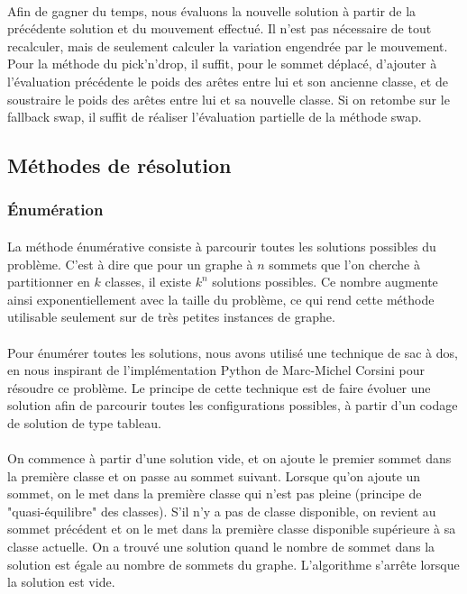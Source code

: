 \documentclass[12pt]{article}
\begin{document}
\paragraph{}Afin de gagner du temps, nous évaluons la nouvelle solution à partir de la précédente solution et du mouvement effectué. Il n'est pas nécessaire de tout recalculer, mais de seulement calculer la variation engendrée par le mouvement. Pour la méthode du pick'n'drop, il suffit, pour le sommet déplacé, d'ajouter à l'évaluation précédente le poids des arêtes entre lui et son ancienne classe, et de soustraire le poids des arêtes entre lui et sa nouvelle classe. Si on retombe sur le fallback swap, il suffit de réaliser l'évaluation partielle de la méthode swap.

\subsection{Méthodes de résolution}

\subsubsection{Énumération}

\paragraph{}La méthode énumérative consiste à parcourir toutes les solutions possibles du problème. C'est à dire que pour un graphe à $n$ sommets que l'on cherche à partitionner en $k$ classes, il existe $k^n$ solutions possibles. Ce nombre augmente ainsi exponentiellement avec la taille du problème, ce qui rend cette méthode utilisable seulement sur de très petites instances de graphe.

\paragraph{}Pour énumérer toutes les solutions, nous avons utilisé une technique de sac à dos, en nous inspirant de l'implémentation Python de Marc-Michel Corsini pour résoudre ce problème. Le principe de cette technique est de faire évoluer une solution afin de parcourir toutes les configurations possibles, à partir d'un codage de solution de type tableau.

\paragraph{}On commence à partir d'une solution vide, et on ajoute le premier sommet dans la première classe et on passe au sommet suivant. Lorsque qu'on ajoute un sommet, on le met dans la première classe qui n'est pas pleine (principe de "quasi-équilibre" des classes). S'il n'y a pas de classe disponible, on revient au sommet précédent et on le met dans la première classe disponible supérieure à sa classe actuelle. On a trouvé une solution quand le nombre de sommet dans la solution est égale au nombre de sommets du graphe. L'algorithme s'arrête lorsque la solution est vide.
\end{document}
